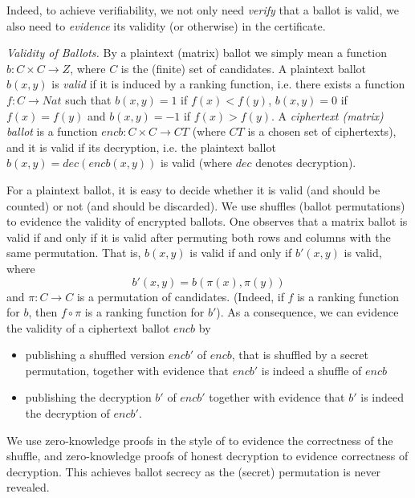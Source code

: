 \noindent
Indeed, to achieve verifiability, we not only need \emph{verify}
that a ballot is valid, we also need to \emph{evidence} its validity
(or otherwise) in the certificate.  

\smallskip\noindent\emph{Validity of Ballots.} By a plaintext
(matrix) ballot
we simply mean a function $b: C \times C \to Z$,
where $C$ is the (finite) set of candidates. A 
plaintext ballot $b(x, y)$ 
is \emph{valid} if it is induced by a ranking function, i.e.
there exists a function $f: C \to Nat$ such that $b(x, y) = 1$ if
$f(x) < f(y)$, $b(x, y) = 0$ if $f(x) = f(y)$ and $b(x, y) = -1$ if
$f(x) > f(y)$. A \emph{ciphertext (matrix) ballot} is a function
$encb: C \times C \to CT$ (where $CT$ is a chosen set of
ciphertexts), and it is valid if its decryption,  i.e. the plaintext
ballot $b(x, y)  = dec(encb(x, y))$ is valid (where $dec$ denotes
decryption).

For a plaintext ballot, it is easy to decide whether it is
valid (and should be counted) or not (and should be discarded). We
use shuffles (ballot permutations) to evidence the validity of
encrypted ballots. One observes that a matrix ballot is valid if and
only if it is valid after permuting both rows and columns with the
same permutation. That is, $b(x,y)$ is valid if and only if $b'(x,y)$
is valid, where
\[ b'(x,y) = b(\pi(x), \pi(y)) \]
and $\pi: C \to C$ is a permutation of candidates. (Indeed, if $f$
is a ranking function for $b$, then $f \circ \pi$ is a ranking
function for $b'$). As a consequence, we can evidence the validity
of a ciphertext ballot $encb$ by
\begin{itemize}
  \item publishing a shuffled version $encb'$ of $encb$, that is
  shuffled by a secret permutation, together with
  evidence that $encb'$ is indeed a shuffle of $encb$
  \item publishing the decryption $b'$ of $encb'$ together with
  evidence that $b'$ is indeed the decryption of $encb'$.
\end{itemize}

\noindent
We use zero-knowledge proofs in the style of \citep{DBLP:conf/africacrypt/TereliusW10}
to evidence the correctness of the shuffle, and zero-knowledge
proofs of honest decryption \citep{DBLP:conf/crypto/ChaumP92} to evidence
correctness of decryption. This achieves ballot secrecy as
the (secret) permutation is never revealed.


